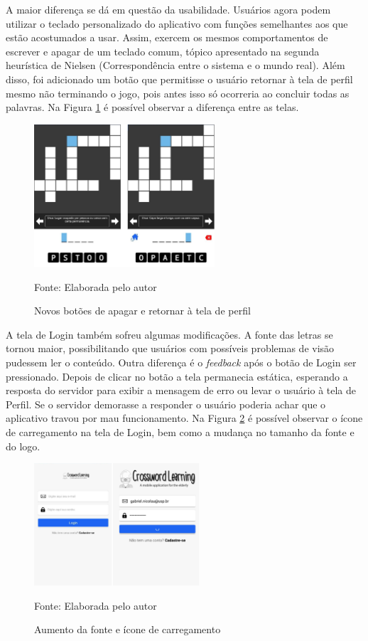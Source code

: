 A maior diferença se dá em questão da usabilidade. Usuários agora podem utilizar o teclado personalizado do aplicativo com funções semelhantes aos que estão acostumados a usar. Assim, exercem os mesmos comportamentos de escrever e apagar de um teclado comum, tópico apresentado na segunda heurística de Nielsen (Correspondência entre o sistema e o mundo real).
Além disso, foi adicionado um botão que permitisse o usuário retornar à tela de perfil mesmo não terminando o jogo, pois antes isso só ocorreria ao concluir todas as palavras. Na Figura \ref{fig:cross-old-new} é possível observar a diferença entre as telas.

\begin{figure}[H]
\centering
    \caption{Novos botões de apagar e retornar à tela de perfil}
    \label{fig:cross-old-new}
    \includegraphics[width=0.6\textwidth]{Figuras/cross-old-new.jpg}
    
    Fonte: Elaborada pelo autor
\end{figure}

A tela de Login também sofreu algumas modificações. A fonte das letras se tornou maior, possibilitando que usuários com possíveis problemas de visão pudessem ler o conteúdo. Outra diferença é o \textit{feedback} após o botão de Login ser pressionado. Depois de clicar no botão a tela permanecia estática, esperando a resposta do servidor para exibir a mensagem de erro ou levar o usuário à tela de Perfil. Se o servidor demorasse a responder o usuário poderia achar que o aplicativo travou por mau funcionamento. Na Figura \ref{fig:login-old-new} é possível observar o ícone de carregamento na tela de Login, bem como a mudança no tamanho da fonte e do logo.

\begin{figure}[H]
\centering
    \caption{Aumento da fonte e ícone de carregamento}
    \label{fig:login-old-new}
    \includegraphics[width=0.55\textwidth]{Figuras/login-old-new.jpg}
    
    Fonte: Elaborada pelo autor
\end{figure}

